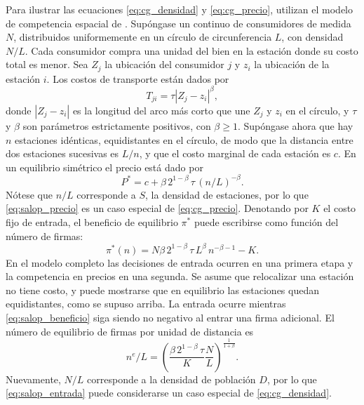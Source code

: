 Para ilustrar las ecuaciones \eqref{eq:cg_densidad} y \eqref{eq:cg_precio}, \textcite{CLEMENZGUGLER2006} utilizan el modelo de competencia espacial de \textcite{SALOP1979}. Supóngase un continuo de consumidores de medida $N$, distribuidos uniformemente en un círculo de circunferencia $L$, con densidad $N/L$. Cada consumidor compra una unidad del bien en la estación donde su costo total es menor. Sea $Z_j$ la ubicación del consumidor $j$ y $z_i$ la ubicación de la estación $i$. Los costos de transporte están dados por
\begin{equation}
    T_{ji} = \tau \left| Z_j - z_i \right|^{\beta},
    \label{eq:salop_transporte}
\end{equation}
donde $\left| Z_j - z_i \right|$ es la longitud del arco más corto que une $Z_j$ y $z_i$ en el círculo, y $\tau$ y $\beta$ son parámetros estrictamente positivos, con $\beta \geq 1$. Supóngase ahora que hay $n$ estaciones idénticas, equidistantes en el círculo, de modo que la distancia entre dos estaciones sucesivas es $L/n$, y que el costo marginal de cada estación es $c$. En un equilibrio simétrico el precio está dado por
\begin{equation*}
    P^{*} = c + \beta\, 2^{1-\beta}\, \tau\, (n/L)^{-\beta}.
\end{equation*}
Nótese que $n/L$ corresponde a $S$, la densidad de estaciones, por lo que \eqref{eq:salop_precio} es un caso especial de \eqref{eq:cg_precio}. Denotando por $K$ el costo fijo de entrada, el beneficio de equilibrio $\pi^{*}$ puede escribirse como función del número de firmas:
\begin{equation}
    \pi^{*}(n) = N \beta\, 2^{1-\beta}\, \tau\, L^{\beta}\, n^{-\beta-1} - K.
    \label{eq:salop_beneficio}
\end{equation}
En el modelo completo las decisiones de entrada ocurren en una primera etapa y la competencia en precios en una segunda. Se asume que relocalizar una estación no tiene costo, y puede mostrarse que en equilibrio las estaciones quedan equidistantes, como se supuso arriba. La entrada ocurre mientras \eqref{eq:salop_beneficio} siga siendo no negativo al entrar una firma adicional. El número de equilibrio de firmas por unidad de distancia es
\begin{equation}
    n^{e}/L = \left( \frac{\beta\, 2^{1-\beta}\, \tau}{K} \frac{N}{L} \right)^{\frac{1}{1+\beta}}.
    \label{eq:salop_entrada}
\end{equation}
Nuevamente, $N/L$ corresponde a la densidad de población $D$, por lo que \eqref{eq:salop_entrada} puede considerarse un caso especial de \eqref{eq:cg_densidad}.

